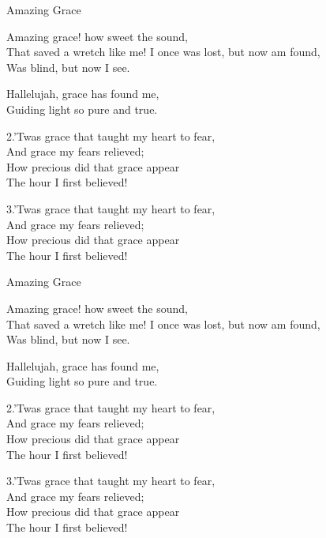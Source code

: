 \documentclass[12pt]{article}
\begin{document}
\begin{hymn}{2}{Amazing Grace}

\begin{stanza}
Amazing grace! how sweet the sound,\\
That saved a wretch like me!
I once was lost, but now am found,\\
Was blind, but now I see.
\end{stanza}

\begin{chorus}
Hallelujah, grace has found me,\\
Guiding light so pure and true.
\end{chorus}

\begin{stanza}
2.’Twas grace that taught my heart to fear,\\
And grace my fears relieved;\\
How precious did that grace appear\\
The hour I first believed!
\end{stanza}

\begin{stanza}
3.’Twas grace that taught my heart to fear,\\
And grace my fears relieved;\\
How precious did that grace appear\\
The hour I first believed!
\end{stanza}
\end{hymn}

\begin{hymn}{3}{Amazing Grace}

\begin{stanza}
Amazing grace! how sweet the sound,\\
That saved a wretch like me!
I once was lost, but now am found,\\
Was blind, but now I see.
\end{stanza}

\begin{chorus}
Hallelujah, grace has found me,\\
Guiding light so pure and true.
\end{chorus}

\begin{stanza}
2.’Twas grace that taught my heart to fear,\\
And grace my fears relieved;\\
How precious did that grace appear\\
The hour I first believed!
\end{stanza}

\begin{stanza}
3.’Twas grace that taught my heart to fear,\\
And grace my fears relieved;\\
How precious did that grace appear\\
The hour I first believed!
\end{stanza}
\end{hymn}
\end{document}
